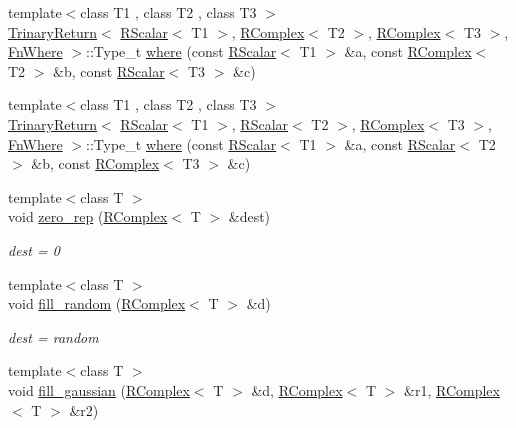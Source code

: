 \begin{DoxyCompactItemize}
\item 
{\footnotesize template$<$class T1 , class T2 , class T3 $>$ }\\\mbox{\hyperlink{structENSEM_1_1TrinaryReturn}{Trinary\+Return}}$<$ \mbox{\hyperlink{classENSEM_1_1RScalar}{R\+Scalar}}$<$ T1 $>$, \mbox{\hyperlink{classENSEM_1_1RComplex}{R\+Complex}}$<$ T2 $>$, \mbox{\hyperlink{classENSEM_1_1RComplex}{R\+Complex}}$<$ T3 $>$, \mbox{\hyperlink{structENSEM_1_1FnWhere}{Fn\+Where}} $>$\+::Type\+\_\+t \mbox{\hyperlink{group__rcomplex_gadf07511990ea74c6e0d3b72f19e880f3}{where}} (const \mbox{\hyperlink{classENSEM_1_1RScalar}{R\+Scalar}}$<$ T1 $>$ \&a, const \mbox{\hyperlink{classENSEM_1_1RComplex}{R\+Complex}}$<$ T2 $>$ \&b, const \mbox{\hyperlink{classENSEM_1_1RScalar}{R\+Scalar}}$<$ T3 $>$ \&c)
\item 
{\footnotesize template$<$class T1 , class T2 , class T3 $>$ }\\\mbox{\hyperlink{structENSEM_1_1TrinaryReturn}{Trinary\+Return}}$<$ \mbox{\hyperlink{classENSEM_1_1RScalar}{R\+Scalar}}$<$ T1 $>$, \mbox{\hyperlink{classENSEM_1_1RScalar}{R\+Scalar}}$<$ T2 $>$, \mbox{\hyperlink{classENSEM_1_1RComplex}{R\+Complex}}$<$ T3 $>$, \mbox{\hyperlink{structENSEM_1_1FnWhere}{Fn\+Where}} $>$\+::Type\+\_\+t \mbox{\hyperlink{group__rcomplex_ga69c3ed4f12ac9e2b1fcba29be62f0622}{where}} (const \mbox{\hyperlink{classENSEM_1_1RScalar}{R\+Scalar}}$<$ T1 $>$ \&a, const \mbox{\hyperlink{classENSEM_1_1RScalar}{R\+Scalar}}$<$ T2 $>$ \&b, const \mbox{\hyperlink{classENSEM_1_1RComplex}{R\+Complex}}$<$ T3 $>$ \&c)
\item 
{\footnotesize template$<$class T $>$ }\\void \mbox{\hyperlink{group__rcomplex_gaf64745e6e9f179738a187230acf6b2ea}{zero\+\_\+rep}} (\mbox{\hyperlink{classENSEM_1_1RComplex}{R\+Complex}}$<$ T $>$ \&dest)
\begin{DoxyCompactList}\small\item\em dest = 0 \end{DoxyCompactList}\item 
{\footnotesize template$<$class T $>$ }\\void \mbox{\hyperlink{group__rcomplex_ga376839cc33ca36a705bdb22f74bb22d4}{fill\+\_\+random}} (\mbox{\hyperlink{classENSEM_1_1RComplex}{R\+Complex}}$<$ T $>$ \&d)
\begin{DoxyCompactList}\small\item\em dest = random \end{DoxyCompactList}\item 
{\footnotesize template$<$class T $>$ }\\void \mbox{\hyperlink{group__rcomplex_gaa47b1150a227265f108216052a5029d8}{fill\+\_\+gaussian}} (\mbox{\hyperlink{classENSEM_1_1RComplex}{R\+Complex}}$<$ T $>$ \&d, \mbox{\hyperlink{classENSEM_1_1RComplex}{R\+Complex}}$<$ T $>$ \&r1, \mbox{\hyperlink{classENSEM_1_1RComplex}{R\+Complex}}$<$ T $>$ \&r2)

\end{DoxyCompactItemize}
